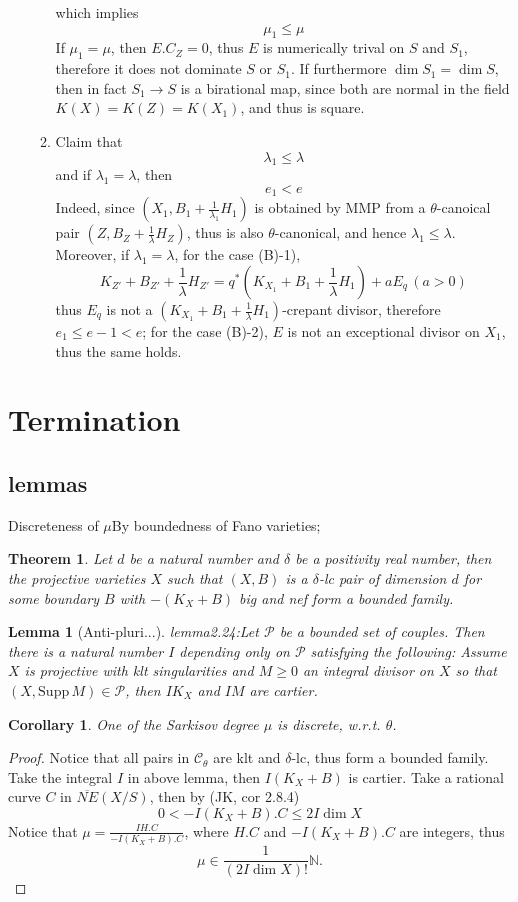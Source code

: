 \documentclass{article}
\newtheorem{lem}[defn]{Lemma}
\newtheorem{thm}[defn]{Theorem}
\newtheorem{cor}[defn]{Corollary}
\begin{document}
\begin{enumerate}[(A)]
\begin{enumerate}[1)]
  which implies 
  $$ \mu_1\leqslant \mu $$
  If $ \mu_1=\mu $, then $ E.C_Z=0 $, thus $ E $ is numerically trival on $ S $ and $ S_1 $, therefore it  does not dominate $ S $ or $ S_1 $. If furthermore $ \dim S_1=\dim S $, then in fact $  S_1\to S  $ is a birational map, since both are normal in the field $ K(X)=K(Z)=K(X_1) $, and thus is square.
  \item Claim that 
  $$ \lambda_1\leqslant \lambda $$
  and if $ \lambda_1=\lambda $, then 
  $$ e_1<e $$
  Indeed, since $ (X_1,B_1+\frac{1}{\lambda_1}H_1) $ is obtained by MMP from a $ \theta $-canoical pair $ (Z,B_Z+\frac{1}{\lambda}H_Z) $, thus is also $ \theta $-canonical, and hence $ \lambda_1\leqslant \lambda $. Moreover, if $ \lambda_1=\lambda $, for the case (B)-1), 
  $$ K_{Z'}+B_{Z'}+\frac{1}{\lambda}H_{Z'}=q^*(K_{X_1}+B_1+\frac{1}{\lambda}H_1)+aE_q\, (a>0) $$
  thus $ E_q $ is not a $ (K_{X_1}+B_1+\frac{1}{\lambda}H_1) $-crepant divisor, therefore $ e_1\leqslant e-1<e $; for the case (B)-2), $ E $ is not an exceptional divisor on $ X_1 $, thus the same holds.
  \end{enumerate} 
\end{enumerate}

\section{Termination}


\subsection{lemmas}
Discreteness of $ \mu $By boundedness of Fano varieties;
\begin{thm}
  Let $ d $ be a natural number and $ \delta $ be a positivity real number, then the projective varieties $ X $ such that $ (X,B) $ is a $ \delta $-lc pair of dimension $ d $ for some boundary $ B $ with $ -(K_X+B) $ big  and nef form a bounded family.
\end{thm}
\begin{lem}
  [Anti-pluri...]lemma2.24:Let $ \mathcal{P} $ be  a bounded set of couples. Then there is  a natural number $ I $ depending only on $ \mathcal{P} $ satisfying the following: Assume $ X $ is projective with klt singularities and $ M\geqslant 0 $ an integral divisor on $ X $ so that $ (X,\mathrm{Supp}\, M)\in \mathcal{P} $, then $ IK_X $ and $ IM $ are cartier.
\end{lem}

\begin{cor}
  One of the Sarkisov  degree $ \mu $ is discrete, w.r.t. $ \theta $.
\end{cor}
\begin{proof}
  Notice that all pairs in $ \mathcal{C}_\theta $ are klt and $ \delta $-lc, thus form a bounded family. Take the integral $ I $ in above lemma, then $ I(K_X+B) $ is cartier. Take a rational curve $ C $ in $ \overline{NE}(X/S) $, then by (JK, cor 2.8.4)
  $$ 0<-I(K_X+B).C\leqslant 2I\dim X $$
  Notice that $ \mu=\frac{IH.C}{-I(K_X+B).C} $, where $ H.C $ and $ -I(K_X+B).C $ are integers, thus 
  $$ \mu\in \frac{1}{(2I\dim X)!}\mathbb{N}.  $$
\end{proof}
\end{document}
